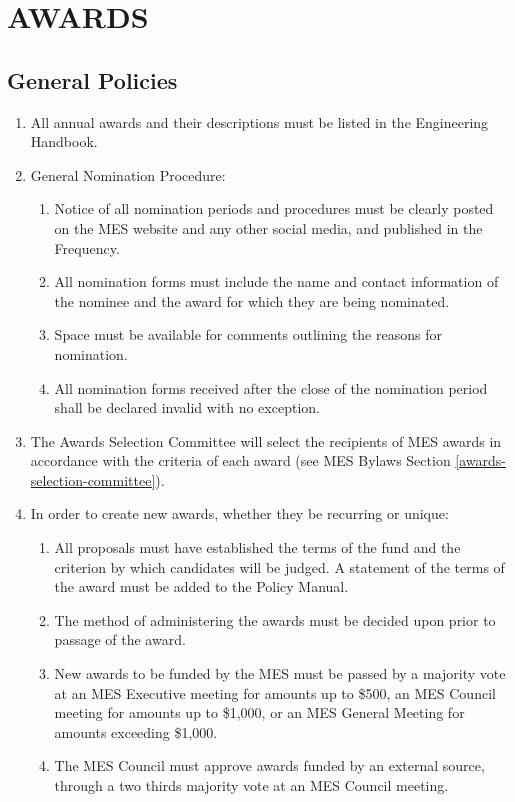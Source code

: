 \hypertarget{awards}{%
 \section{AWARDS}
 \label{awards}}

\hypertarget{general-policies}{%
 \subsection{General Policies}
 \label{general-policies}}
\begin{enumerate}
 \item
  All annual awards and their descriptions must be listed in the
  Engineering Handbook.
 \item
  General Nomination Procedure:

  \begin{enumerate}
   \item
    Notice of all nomination periods and procedures must be clearly
    posted on the MES website and any other social media, and published
    in the Frequency.
   \item
    All nomination forms must include the name and contact information
    of the nominee and the award for which they are being nominated.
   \item
    Space must be available for comments outlining the reasons for
    nomination.
   \item
    All nomination forms received after the close of the nomination
    period shall be declared invalid with no exception.
  \end{enumerate}
 \item
  The Awards Selection Committee will select the recipients of MES
  awards in accordance with the criteria of each award (see MES Bylaws
  Section \ref{awards-selection-committee}).
 \item
  In order to create new awards, whether they be recurring or unique:

  \begin{enumerate}
   \item
    All proposals must have established the terms of the fund and the
    criterion by which candidates will be judged. A statement of the
    terms of the award must be added to the Policy Manual. %
   \item
    The method of administering the awards must be decided upon prior to
    passage of the award.
   \item
    New awards to be funded by the MES must be passed by a majority vote
    at an MES Executive meeting for amounts up to \$500, an MES Council
    meeting for amounts up to \$1,000, or an MES General Meeting for
    amounts exceeding \$1,000.
   \item
    The MES Council must approve awards funded by an external source,
    through a two thirds majority vote at an MES Council meeting.
  \end{enumerate}
\end{enumerate}

